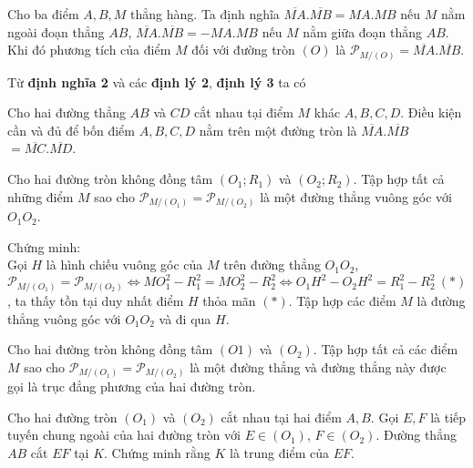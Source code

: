 \begin{dang}
	\begin{dn}
		Cho ba điểm $A,B,M$ thẳng hàng. Ta định nghĩa   $\overline{MA}.\overline{MB} = MA.MB$ nếu $M$ nằm ngoài đoạn thẳng $AB$,  $\overline{MA}.\overline{MB} = -MA.MB$ nếu $M$ nằm giữa đoạn thẳng $AB$. 
		Khi đó phương tích của điểm $M$ đối với đường tròn $(O)$ là $\mathscr{P}_{M/(O)} = \overline{MA}.\overline{MB}$. 
	\end{dn}
	Từ \textbf{định nghĩa 2} và các \textbf{định lý 2}, \textbf{định lý 3} ta có 
	\begin{dl}
		Cho hai đường thẳng $AB$ và $CD$ cắt nhau tại điểm $M$ khác $A,B,C,D$. Điều kiện cần và đủ để bốn điểm $A,B,C,D$ nằm trên một đường tròn là $\overline{MA}.\overline{MB}$ $= \overline{MC}.\overline{MD}$. 
	\end{dl}
	
	\begin{dl}
		Cho hai đường tròn không đồng tâm $(O_1;R_1)$ và $(O_2;R_2)$. Tập hợp tất cả những điểm $M$ sao cho $\mathscr{P}_{M/(O_1)} = \mathscr{P}_{M/(O_2)}$ là một đường thẳng vuông góc với $O_1O_2$.
	\end{dl}
	Chứng minh: \\
	Gọi $H$ là hình chiếu vuông góc của $M$ trên đường thẳng $O_1O_2$, $\mathscr{P}_{M/(O_1)} = \mathscr{P}_{M/(O_2)} \Leftrightarrow MO_1^2 -R_1^2 =  MO_2^2 -R_2^2 \Leftrightarrow O_1H^2 - O_2H^2=R_1^2-R_2^2~ (*)$, ta thấy tồn tại duy nhất điểm $H$ thỏa mãn $(*)$. Tập hợp các điểm $M$ là đường thẳng vuông góc với $O_1O_2$ và đi qua $H$.
	\begin{dn}
		Cho hai đường tròn không đồng tâm $(O1)$ và $(O_2)$. Tập hợp tất cả các điểm $M$ sao cho $\mathscr{P}_{M/(O_1)} = \mathscr{P}_{M/(O_2)}$ là một đường thẳng và đường thẳng này được gọi là trục đẳng phương của hai đường tròn.
	\end{dn}
\end{dang}

\setcounter{vd}{0}
\begin{vd}%
	Cho hai đường tròn $(O_1)$ và $(O_2)$ cắt nhau tại hai điểm $A,B$. Gọi $E,F$ là tiếp tuyến chung ngoài của hai đường tròn với $E \in (O_1)$, $F \in (O_2)$. Đường thẳng $AB$ cắt $EF$ tại $K$. Chứng minh rằng $K$ là trung điểm của $EF$.   
\end{vd}

